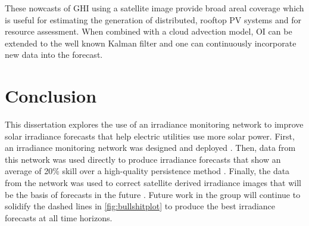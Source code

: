 \documentclass[12pt,letterpaper,notitlepage,openany]{article}
\begin{document}
These nowcasts of GHI using a satellite image provide broad areal
coverage which is useful for estimating the generation of distributed,
rooftop PV systems and for resource assessment.
When combined with a cloud advection model, OI can be extended to the
well known Kalman filter and one can continuously incorporate new data
into the forecast.

\section{Conclusion}
This dissertation explores the use of an irradiance monitoring network
to improve solar irradiance forecasts that help electric utilities use
more solar power.
First, an irradiance monitoring network was designed and deployed \citep{Lorenzo2014}.
Then, data from this network was used directly to produce irradiance
forecasts that show an average of 20\% skill over a high-quality
persistence method \citep{Lorenzo2015c}.
Finally, the data from the network was used to correct satellite
derived irradiance images that will be the basis of forecasts in the
future \citep{Lorenzo2017}.
Future work in the group will continue to solidify the dashed lines in
\cref{fig:bullshitplot} to produce the best irradiance forecasts at
all time horizons.



\end{document}
